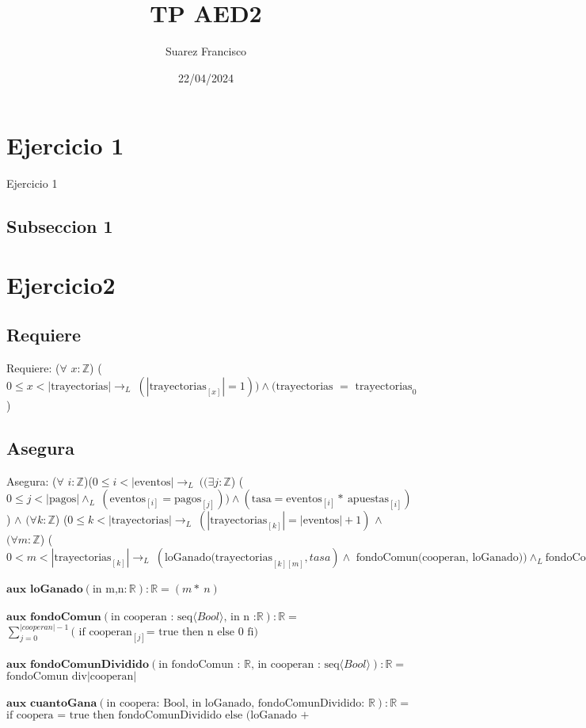 \documentclass[10pt, a4paper]{article} %
\author{Suarez Francisco}
\date{22/04/2024}
\title{TP AED2}
\begin{document}
\section{Ejercicio 1}

Ejercicio 1

\subsection{Subseccion 1}

\section{Ejercicio2}
\subsection{Requiere}
Requiere: ($\forall$ \(x :  \mathbb{Z} \)) (\(0 \leq x < |\text{trayectorias}| \rightarrow _{L}\  (|\text{trayectorias}_{[x]}| = 1))  \land ( \text{trayectorias } = \text{ trayectorias}_{0}\))
\subsection{Asegura}
Asegura: ($\forall$ \( i :  \mathbb{Z} \))(\(0 \leq i < |\text{eventos}| \rightarrow _{L}\ ((\exists  j :  \mathbb{Z} \)) (\(0 \leq j < |\text{pagos}| \land _{L}\ (\text{eventos}_{[i]} = \text{pagos}_{[j]})) \land ( \text{tasa} = \text{eventos}_{[i]} \ast\ \text{apuestas}_{[i]})\)) \(\land\) \((\forall k : \mathbb{Z} \)) (\(0 \leq k < |\text{trayectorias}| \rightarrow _{L}\ (|\text{trayectorias}_{[k]}| = |\text{eventos}| + 1)\) \(\land\) \((\forall m : \mathbb{Z} \)) (\(0 < m < |\text{trayectorias}_{[k]}| \rightarrow_{L}\ (\text{loGanado(trayectorias}_{[k][m]} , tasa) \land \text{ fondoComun(cooperan, loGanado)}) \land_{L} \text{fondoComunDividido(fondoComun,cooperan)} \land_{L} (\text{trayectorias}_{[k][m]} = \text{cuantoGana(} \text{cooperan}_{[k]} \text{, loGanado, fondoComunDividido)}) \land \text{trayectorias}_{[k][0]} = \text{trayectorias}_{0[k][0]}) \) 
\\ \\
$\textbf{aux loGanado} (\text{in m,n} : \mathbb{R}) : \mathbb{R} = (m \ast\ n)$ \\ \\
$\textbf{aux fondoComun} (\text{in cooperan : seq} \langle Bool \rangle \text{, in n :} \mathbb{R}) : \mathbb{R} =$\\
$\sum_{j=0}^{|cooperan|-1} \text{( if} \text{ cooperan}_{[j]} \text{= true then n else 0 fi)}$ 
\\ \\
$\textbf{aux fondoComunDividido} (\text{in fondoComun : }	\mathbb{R}	\text{, in cooperan : seq} \langle Bool \rangle)  : \mathbb{R} = $\\
$ \text{fondoComun div} |\text{cooperan}|$
\\ \\
$\textbf{aux cuantoGana} (\text{in coopera: Bool, in loGanado, fondoComunDividido: }  \mathbb{R}) : \mathbb{R} =$ \\
$\text{if coopera = true then fondoComunDividido else (loGanado + fondoComunDividido}$
\end{document}
